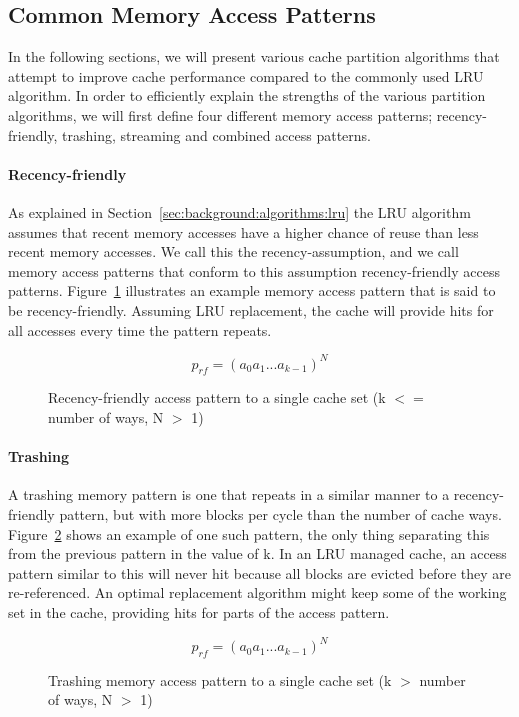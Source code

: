 \subsection{Common Memory Access Patterns}
In the following sections, we will present various cache partition algorithms that attempt to improve cache performance compared to the commonly used LRU algorithm.
In order to efficiently explain the strengths of the various partition algorithms, we will first define four different memory access patterns; recency-friendly, trashing, streaming and combined access patterns.

\paragraph{Recency-friendly}
As explained in Section~\ref{sec:background:algorithms:lru} the LRU algorithm assumes that recent memory accesses have a higher chance of reuse than less recent memory accesses.
We call this the recency-assumption, and we call memory access patterns that conform to this assumption recency-friendly access patterns.
Figure~\ref{fig:background:algorithms:rf_pattern} illustrates an example memory access pattern that is said to be recency-friendly.
Assuming LRU replacement, the cache will provide hits for all accesses every time the pattern repeats.

\begin{figure}[ht]
\centering
\begin{equation}
p_{rf} = (a_0 a_1 ... a_{k-1})^N
\end{equation}
\caption{Recency-friendly access pattern to a single cache set (k $<=$ number of ways, N $>$ 1)}
\label{fig:background:algorithms:rf_pattern}
\end{figure}

\paragraph{Trashing}
A trashing memory pattern is one that repeats in a similar manner to a recency-friendly pattern, but with more blocks per cycle than the number of cache ways. 
Figure~\ref{fig:background:algorithms:tr_pattern} shows an example of one such pattern, the only thing separating this from the previous pattern in the value of k.
In an LRU managed cache, an access pattern similar to this will never hit because all blocks are evicted before they are re-referenced.
An optimal replacement algorithm might keep some of the working set in the cache, providing hits for parts of the access pattern.
\begin{figure}[ht]
\centering
\begin{equation}
p_{rf} = (a_0 a_1 ... a_{k-1})^N
\end{equation}
\caption{Trashing memory access pattern to a single cache set (k $>$ number of ways, N $>$ 1)}
\label{fig:background:algorithms:tr_pattern}
\end{figure}

